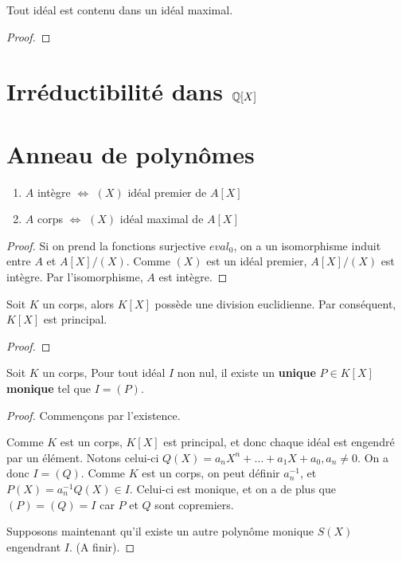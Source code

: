 \begin{theorem}
	Tout idéal est contenu dans un idéal maximal.
\end{theorem}

\ifdefined\outputproof
\begin{proof}

\end{proof}
\fi


\section{Irréductibilité dans $\mathbb{Q}[X]$}

\section{Anneau de polynômes}

\begin{proposition}
	\begin{enumerate}
		\item $A$ intègre $\Leftrightarrow$ $(X)$ idéal premier de $A[X]$
		\item $A$ corps $\Leftrightarrow$ $(X)$ idéal maximal de $A[X]$
	\end{enumerate}
\end{proposition}

\ifdefined\outputproof
\begin{proof}
	Si on prend la fonctions surjective $eval_{0}$, on a un isomorphisme induit
	entre $A$ et $A[X]/(X)$. Comme $(X)$ est un idéal premier, $A[X]/(X)$ est
	intègre. Par l'isomorphisme, $A$ est intègre.
\end{proof}
\fi

\begin{proposition}
	Soit $K$ un corps, alors $K[X]$ possède une division euclidienne. Par
	conséquent, $K[X]$ est principal.
\end{proposition}

\ifdefined\outputproof
\begin{proof}
\end{proof}
\fi

\begin{proposition}
	Soit $K$ un corps,
	Pour tout idéal $I$ non nul, il existe un \textbf{unique} $P \in K[X]$
	\textbf{monique} tel que $I = (P)$.
\end{proposition}

\ifdefined\outputproof
\begin{proof}
	Commençons par l'existence.

	Comme $K$ est un corps, $K[X]$ est principal, et donc chaque idéal est
	engendré par un élément. Notons celui-ci $Q(X) = a_{n}X^{n} + \ldots +
	a_{1}X + a_{0}, a_{n} \ne 0$. On a donc $I = (Q)$. Comme $K$ est un corps, on peut
	définir $a_{n}^{-1}$, et $P(X) = a_{n}^{-1}Q(X) \in I$. Celui-ci est
	monique, et on a de plus que $(P) = (Q) = I$ car $P$ et $Q$ sont copremiers.

	Supposons maintenant qu'il existe un autre polynôme monique $S(X)$
	engendrant $I$. (A finir).
\end{proof}
\fi

